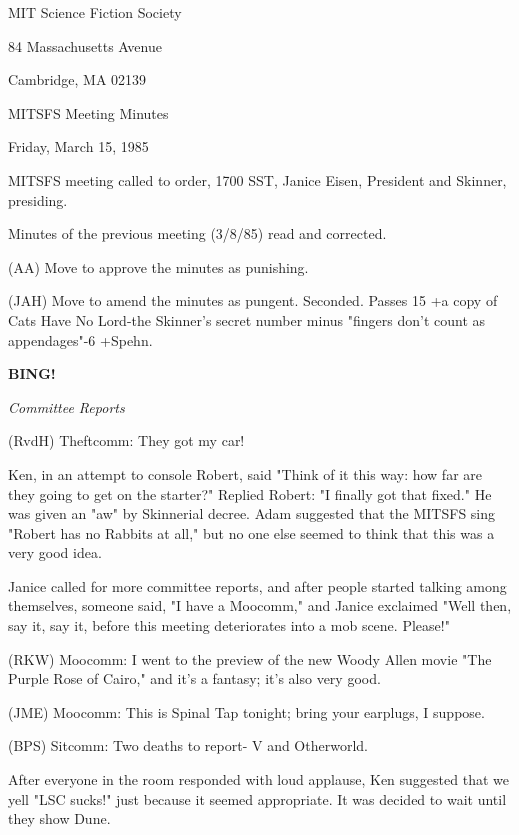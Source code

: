\documentclass[12pt]{article}
\newcommand{\bing}{{\bf BING!} }
\newcommand{\goto}[1]{\bing \vskip 12pt \centerline{{\em{#1}}}}
\begin{document}
\begin{center}

MIT Science Fiction Society 

84 Massachusetts Avenue

Cambridge, MA 02139

\vspace{12pt}

MITSFS Meeting Minutes 

Friday, March 15, 1985

\end{center}
 
\vspace{18pt}

\setlength{\parskip}{6pt}

\noindent
MITSFS meeting called to order, 1700 SST,
Janice Eisen, President and Skinner, presiding.

Minutes of the previous meeting (3/8/85) read and corrected.

(AA) Move to approve the minutes as punishing.

(JAH) Move to amend the minutes as pungent. Seconded. Passes 15 +a copy of Cats Have No Lord-the Skinner's secret number minus "fingers don't count as appendages"-6 +Spehn.

\goto{Committee Reports}

(RvdH) Theftcomm: They got my car!

Ken, in an attempt to console Robert, said "Think of it this way: how far are they going to get on the starter?" Replied Robert: "I finally got that fixed." He was given an "aw" by Skinnerial decree. Adam suggested that the MITSFS sing "Robert has no Rabbits at all," but no one else seemed to think that this was a very good idea.

Janice called for more committee reports, and after people started talking among themselves, someone said, "I have a Moocomm," and Janice exclaimed "Well then, say it, say it, before this meeting deteriorates into a mob scene. Please!"

(RKW) Moocomm: I went to the preview of the new Woody Allen movie "The Purple Rose of Cairo," and it's a fantasy; it's also very good.

(JME) Moocomm: This is Spinal Tap tonight; bring your earplugs, I suppose.

(BPS) Sitcomm: Two deaths to report- V and Otherworld.

After everyone in the room responded with loud applause, Ken suggested that we yell "LSC sucks!" just because it seemed appropriate. It was decided to wait until they show Dune.
\end{document}
